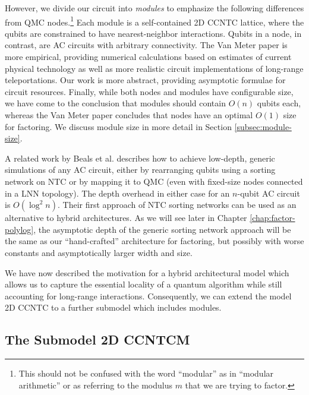 However, we divide our
circuit into \emph{modules} to emphasize the following differences from
\textsf{QMC} nodes.\footnote{This should not be
confused with the word ``modular'' as in ``modular arithmetic'' or as
referring to the modulus $m$ that we are trying to factor.}
Each module is a self-contained \textsf{2D CCNTC} lattice, where the qubits
are constrained to have nearest-neighbor interactions. Qubits in a node,
in contrast, are \textsf{AC} circuits with arbitrary connectivity. The
Van Meter paper is more empirical, providing numerical calculations
based on estimates of current physical technology as well as more realistic
circuit implementations of long-range teleportations. Our work is more
abstract, providing asymptotic formulae for circuit resources. Finally,
while both nodes and modules have configurable size, we have come to the
conclusion that modules should contain $O(n)$ qubits each, whereas
the Van Meter paper concludes that nodes have an optimal $O(1)$ size for 
factoring.
We discuss module size in more detail in Section \ref{subsec:module-size}.

A related work by Beals et al. \cite{Beals2012} describes how to achieve
low-depth, generic simulations of any \textsf{AC} circuit, either by
rearranging qubits using a sorting network on \textsf{NTC} or
by mapping it to \textsf{QMC}
(even with fixed-size nodes connected in a \textsf{LNN} topology). The
depth overhead in either case for an $n$-qubit \textsf{AC} circuit is $O(\log^2 n)$. Their first approach of \textsf{NTC} sorting networks can be used
as an alternative to hybrid architectures. As we will see later in
Chapter \ref{chap:factor-polylog}, the asymptotic depth of the generic sorting network approach will be the same as our ``hand-crafted'' architecture for factoring,
but possibly with worse constants and asymptotically larger width and size. 

We have now described the motivation for a hybrid architectural model which
allows us to capture the essential locality of a quantum algorithm while
still accounting for long-range interactions. Consequently, we can
extend the model \textsf{2D CCNTC} to a further submodel which includes
modules.

\subsection{The Submodel \textsf{2D CCNTCM}}
\label{subsec:2dccntcm}

